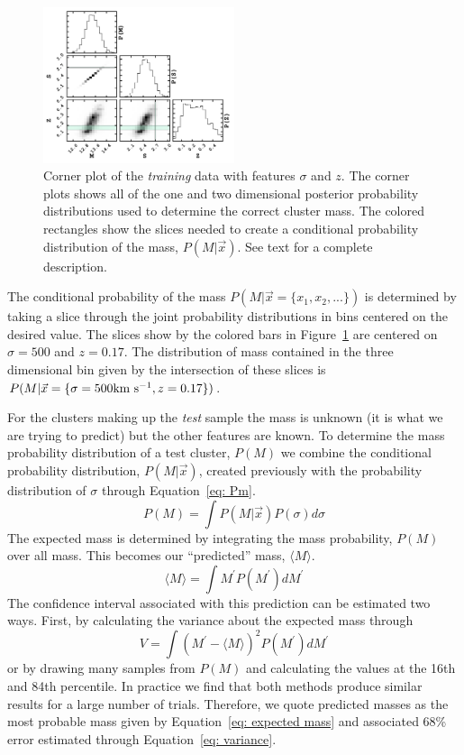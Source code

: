 \documentclass[apj, revtex4]{emulateapj}
\begin{document}
\begin{figure} 
	\includegraphics[width=0.5\textwidth]{cornertest.pdf} 
	\caption{Corner plot of the \emph{training} data with features $\sigma$ and $z$. The corner plots shows all of the one and two dimensional posterior probability distributions used to determine the correct cluster mass. The colored rectangles show the slices needed to create a conditional probability distribution of the mass, $P(M|\vec{x})$. See text for a complete description. } \label{fig: probability corner} 
\end{figure}

The conditional probability of the mass $P(M|\vec{x}= \{ x_1,x_2,...\})$ is determined by taking a slice through the joint probability distributions in bins centered on the desired value. The slices show by the colored bars in Figure~\ref{fig: probability corner} are centered on $\sigma = 500$ \kms and $z=0.17$. The distribution of mass contained in the three dimensional bin given by the intersection of these slices is $P(M|\vec{x} = \{ \sigma=500 \hbox{km~s$^{-1}$},z=0.17\})$.

For the clusters making up the \emph{test} sample the mass is unknown (it is what we are trying to predict) but the other features are known. To determine the mass probability distribution of a test cluster, $P(M)$ we combine the conditional probability distribution, $P(M|\vec{x})$, created previously with the probability distribution of $\sigma$ through Equation~\ref{eq: Pm}.
\begin{equation}\label{eq: Pm}
	P(M) = \int P(M|\vec{x}) P(\sigma) d\sigma
\end{equation}
The expected mass is determined by integrating the mass probability, $P(M)$ over all mass. This becomes our ``predicted'' mass, $\langle M\rangle$.
\begin{equation}\label{eq: expected mass}
	\langle M\rangle = \int M^\prime P(M^\prime)dM^\prime
\end{equation}
The confidence interval associated with this prediction can be estimated two ways. First, by calculating the variance about the expected mass through
\begin{equation}\label{eq: variance}
	V = \int (M^\prime - \langle M\rangle)^2 P(M^\prime)dM^\prime
\end{equation}
or by drawing many samples from $P(M)$ and calculating the values at the 16th and 84th percentile. In practice we find that both methods produce similar results for a large number of trials. Therefore, we quote predicted masses as the most probable mass given by Equation~\ref{eq: expected mass} and associated 68\% error estimated through Equation~\ref{eq: variance}.
\end{document}
